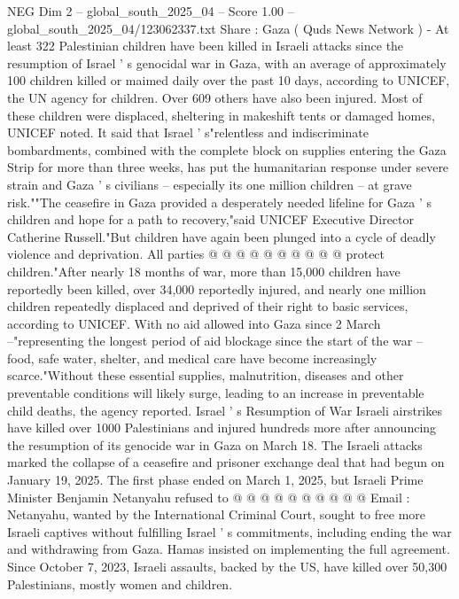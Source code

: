 \begin{textsample}{NEG Dim 2 – global\_south\_2025\_04 – Score 1.00 – global\_south\_2025\_04/123062337.txt}  \label{ex:f2_neg_095}
Share : Gaza ( Quds News Network ) - At least 322 Palestinian children have been killed in Israeli attacks since the resumption of Israel ' s genocidal war in Gaza, with an average of approximately 100 children killed or maimed daily over the past 10 days, according to UNICEF, the UN agency for children.
Over 609 others have also been injured.
Most of these children were displaced, sheltering in makeshift tents or damaged homes, UNICEF noted.
It said that Israel ' s"relentless and indiscriminate bombardments, combined with the complete block on supplies entering the Gaza Strip for more than three weeks, has put the humanitarian response under severe strain and Gaza ' s civilians -- especially its one million children -- at grave risk.""The ceasefire in Gaza provided a desperately needed lifeline for Gaza ' s children and hope for a path to recovery,"said UNICEF Executive Director Catherine Russell."But children have again been plunged into a cycle of deadly violence and deprivation.
All parties @ @ @ @ @ @ @ @ @ @ protect children."After nearly 18 months of war, more than 15,000 children have reportedly been killed, over 34,000 reportedly injured, and nearly one million children repeatedly displaced and deprived of their right to basic services, according to UNICEF.
With no aid allowed into Gaza since 2 March --"representing the longest period of aid blockage since the start of the war -- food, safe water, shelter, and medical care have become increasingly scarce."Without these essential supplies, malnutrition, diseases and other preventable conditions will likely surge, leading to an increase in preventable child deaths, the agency reported.
Israel ' s Resumption of War Israeli airstrikes have killed over 1000 Palestinians and injured hundreds more after announcing the resumption of its genocide war in Gaza on March 18.
The Israeli attacks marked the collapse of a ceasefire and prisoner exchange deal that had begun on January 19, 2025.
The first phase ended on March 1, 2025, but Israeli Prime Minister Benjamin Netanyahu refused to @ @ @ @ @ @ @ @ @ @ Email : Netanyahu, wanted by the International Criminal Court, sought to free more Israeli captives without fulfilling Israel ' s commitments, including ending the war and withdrawing from Gaza.
Hamas insisted on implementing the full agreement.
Since October 7, 2023, Israeli assaults, backed by the US, have killed over 50,300 Palestinians, mostly women and children.

\end{textsample}
